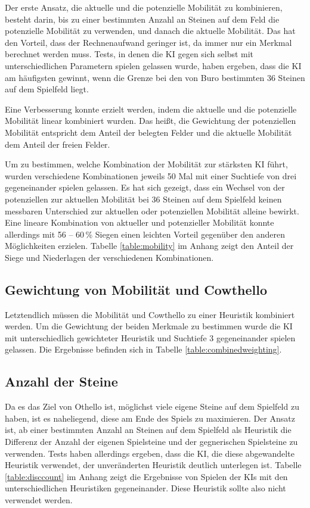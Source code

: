 Der erste Ansatz, die aktuelle und die potenzielle Mobilität zu kombinieren, besteht darin, bis zu einer bestimmten
Anzahl an Steinen auf dem Feld die potenzielle Mobilität zu verwenden, und danach die aktuelle Mobilität. Das hat den
Vorteil, dass der Rechnenaufwand geringer ist, da immer nur ein Merkmal berechnet werden muss. Tests, in denen die KI
gegen sich selbst mit unterschiedlichen Parametern spielen gelassen wurde, haben ergeben, dass die KI am häufigsten
gewinnt, wenn die Grenze bei den von Buro bestimmten 36 Steinen auf dem Spielfeld liegt.

Eine Verbesserung konnte erzielt werden, indem die aktuelle und die potenzielle Mobilität linear kombiniert wurden.
Das heißt, die Gewichtung der potenziellen Mobilität entspricht dem Anteil der belegten Felder und die aktuelle Mobilität
dem Anteil der freien Felder.

Um zu bestimmen, welche Kombination der Mobilität zur stärksten KI führt, wurden verschiedene Kombinationen jeweils 50
Mal mit einer Suchtiefe von drei gegeneinander spielen gelassen. Es hat sich gezeigt, dass ein Wechsel von der
potenziellen zur aktuellen Mobilität bei 36 Steinen auf dem Spielfeld keinen messbaren Unterschied zur aktuellen oder
potenziellen Mobilität alleine bewirkt. Eine lineare Kombination von aktueller und potenzieller Mobilität konnte
allerdings mit 56 – 60\,\% Siegen einen leichten Vorteil gegenüber den anderen Möglichkeiten erzielen. Tabelle
\ref{table:mobility} im Anhang zeigt den Anteil der Siege und Niederlagen der verschiedenen Kombinationen.

\subsection{Gewichtung von Mobilität und Cowthello}
Letztendlich müssen die Mobilität und Cowthello zu einer Heuristik kombiniert werden. Um die Gewichtung der beiden
Merkmale zu bestimmen wurde die KI mit unterschiedlich gewichteter Heuristik und Suchtiefe 3 gegeneinander
spielen gelassen. Die Ergebnisse befinden sich in Tabelle \ref{table:combinedweighting}.

\subsection{Anzahl der Steine}
Da es das Ziel von Othello ist, möglichst viele eigene Steine auf dem Spielfeld zu haben, ist es naheliegend, diese am
Ende des Spiels zu maximieren. Der Ansatz ist, ab einer bestimmten Anzahl an Steinen auf dem Spielfeld als Heuristik die
Differenz der Anzahl der eigenen Spielsteine und der gegnerischen Spielsteine zu verwenden. Tests haben allerdings
ergeben, dass die KI, die diese abgewandelte Heuristik verwendet, der unveränderten Heuristik deutlich unterlegen ist.
Tabelle \ref{table:disccount} im Anhang zeigt die Ergebnisse von Spielen der KIs mit den unterschiedlichen Heuristiken
gegeneinander. Diese Heuristik sollte also nicht verwendet werden.
